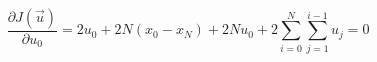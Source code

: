 \documentclass{article}
\begin{document}
\thispagestyle{empty}

$$
\frac{\partial J(\vec{u})}{\partial u_0}  = 2 u_0 + 2N(x_0-x_N) + 2N u_0 +    2\sum\limits_{i=0}^N \sum\limits_{j=1}^{i-1}u_j  = 0
$$
\end{document}
